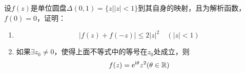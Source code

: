 \begin{proposition}
    
    设$f(z)$是单位圆盘$\Delta(0,1) = \{z \big| |z| < 1 \}$到其自身的映射，且为解析函数，$f(0) = 0$，证明：
    
    \begin{enumerate}
        
        \item   $$|f(z) + f(-z)| \leq 2 |z|^2 \quad (|z| < 1)$$
        
        \item   如果$\exists z_0 \neq 0$，使得上面不等式中的等号在$z_0$处成立，则
                $$f(z) = \mathrm{e}^{\mathrm{i}\theta}z^2(\theta \in \mathbb{{R}})$$

    \end{enumerate}

\end{proposition}


